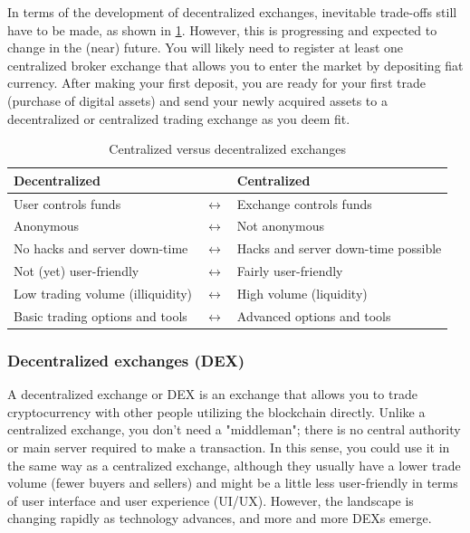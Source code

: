 In terms of the development of decentralized exchanges, inevitable trade-offs still have to be made, as shown in \cref{tab:centralizedvsdecentralized}. However, this is progressing and expected to change in the (near) future. You will likely need to register at least one centralized broker exchange that allows you to enter the market by depositing fiat currency. After making your first deposit, you are ready for your first trade (purchase of digital assets) and send your newly acquired assets to a decentralized or centralized trading exchange as you deem fit.\medskip



\begin{table}[htb]

\centering

\caption{Centralized versus decentralized exchanges}
\begin{tabular}{lcl} 
\toprule
\textbf{Decentralized}         & & \textbf{Centralized}                 \\
\midrule
User controls funds       &$\longleftrightarrow$      & Exchange controls funds              \\
Anonymous            &$\longleftrightarrow$           & Not anonymous                        \\
No hacks and server down-time &$\longleftrightarrow$  & Hacks and server down-time possible  \\
Not (yet) user-friendly    &$\longleftrightarrow$     & Fairly user-friendly                 \\
Low trading volume (illiquidity) &$\longleftrightarrow$ & High volume (liquidity)              \\
Basic trading options and tools&$\longleftrightarrow$ & Advanced options and tools           \\
\bottomrule
\end{tabular}
\label{tab:centralizedvsdecentralized}
\end{table}



\subsubsection{Decentralized exchanges (DEX)}

A decentralized exchange or DEX is an exchange that allows you to trade cryptocurrency with other people utilizing the blockchain directly. Unlike a centralized exchange, you don't need a "middleman"; there is no central authority or main server required to make a transaction. In this sense, you could use it in the same way as a centralized exchange, although they usually have a lower trade volume (fewer buyers and sellers) and might be a little less user-friendly in terms of user interface and user experience (UI/UX). However, the landscape is changing rapidly as technology advances, and more and more DEXs emerge. 

